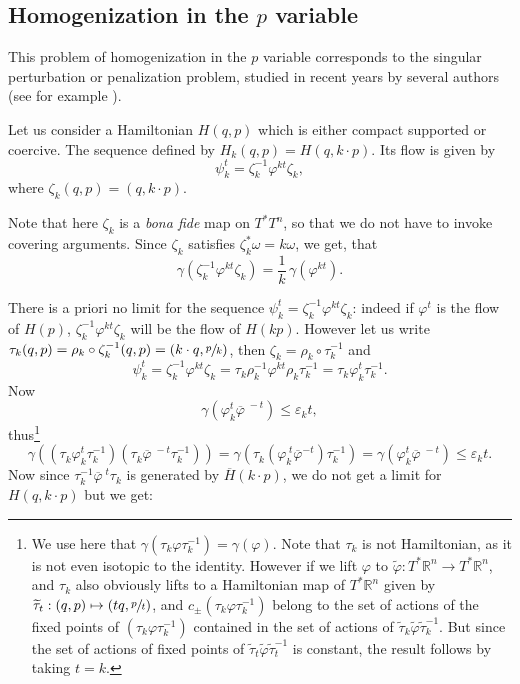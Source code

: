 \documentclass[JEP,XML,SOM,NoFloatCountersInSection,Unicode,published]{cedram}
\newcommand\mto{\mathchoice{\longmapsto}{\mapsto}{\mapsto}{\mapsto}}
\numberwithin{equation}{section}
\let \phi \varphi
\theoremstyle{plain}
\theoremstyle{definition}
\theoremstyle{remark}
\begin{document}
\subsection{Homogenization in the \texorpdfstring{$p$}{p} variable}

This problem of homogenization in the $p$ variable corresponds to the singular perturbation or penalization problem, studied in recent years by several authors (see for example \cite{Alv-Bar1, Alv-Bar2}).

Let us consider a Hamiltonian $H(q,p)$ which is either compact supported or coercive. The sequence defined by $H_{k}(q,p)=H(q, k\cdot p)$. Its flow is given by
\[
\psi_{k}^{t}=\zeta_{k}^{-1}\phi^{kt}\zeta_{k},
\]
where $\zeta_{k} (q,p)=(q,k\cdot p)$.

Note that here $\zeta_{k}$ is a \emph{bona fide} map on $T^*T^n$, so that we do not have to invoke covering arguments. Since $\zeta_{k}$ satisfies $\zeta_{k}^*\omega= k \omega$, we get, that
\[
\gamma (\zeta_{k}^{-1}\phi^{kt}\zeta_{k})=\frac{1}{k}\,\gamma (\phi^{kt}).
\]

There is a priori no limit for the sequence $\psi_k^t=\zeta_{k}^{-1}\phi^{kt}\zeta_{k}$: indeed if $\phi^{t}$ is the flow of $H(p)$, $\zeta_{k}^{-1}\phi^{kt}\zeta_{k}$ will be the flow of $H(kp)$. However let us write $\tau_{k}(q,p)=\rho_k\circ \zeta_k^{-1}(q,p)=(k\cdot q, \sfrac{p}{k})$, then $\zeta_k=\rho_k\circ \tau_k^{-1}$ and
\[
\psi_{k}^{t}=\zeta_{k}^{-1}\phi^{kt}\zeta_{k}= \tau_{k}^{}\rho_{k}^{-1}\phi^{kt}\rho_{k}\tau_{k}^{-1}= \tau_{k}^{} \phi_{k}^{t} \tau_{k}^{-1}.
\]
Now
\[
\gamma (\varphi_{k}^{t} {\overline \varphi}^{\; -t}) \leq \varepsilon _{k}t,
\]
thus\footnote{We use here that $\gamma (\tau_k\varphi \tau_k^{-1})=\gamma (\varphi)$. Note that $\tau_k$ is not Hamiltonian, as it is not even isotopic to the identity. However if we lift $\varphi$ to $\widetilde \varphi: T^*{\mathbb R}^n \to T^* {\mathbb R}^n$, and $\tau_k$ also obviously lifts to a Hamiltonian map of $T^* {\mathbb R}^n$ given by $\widetilde\tau_t: (q,p) \mto (tq,\sfrac{p}{t})$, and $c_\pm (\tau_k\varphi\tau_k^{-1})$ belong to the set of actions of the fixed points of $(\tau_k\varphi \tau_k^{-1})$ contained in the set of actions of $\widetilde\tau_k \widetilde\varphi \widetilde \tau_k^{-1}$. But since the set of actions of fixed points of $\widetilde\tau_t \widetilde\varphi \widetilde \tau_t^{-1}$ is constant, the result follows by taking $t=k$.}
\[
\gamma \left ((\tau_{k}^{} \varphi_{k}^{t} \tau_{k}^{-1})(\tau_{k}^{} {\overline\varphi}^{\;-t} \tau_{k}^{-1})\right) = \gamma (\tau_{k}^{} (\varphi_{k}^{\; t} {\overline\varphi}^{-t}) \tau_{k}^{-1}) = \gamma (\varphi_{k}^{t} {\overline\varphi}^{\;-t}) \leq \varepsilon_{k} t.
\]
Now since $ \tau_{k}^{-1}\overline\phi^{\; t}\tau_{k}$ is generated by ${\overline H} (k\cdot p)$, we do not get a limit for $H(q,k\cdot p)$ but we get:
\end{document}
